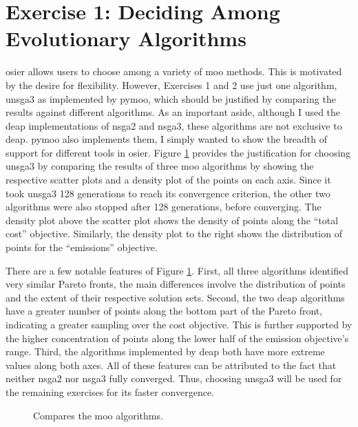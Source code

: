\section{Exercise 1: Deciding Among Evolutionary Algorithms}

\ac{osier} allows users to choose among a variety of \ac{moo} methods. This is
motivated by the desire for flexibility. However, Exercises 1 and 2 use just one
algorithm, \ac{unsga3} as implemented by \ac{pymoo}, which should be justified
by comparing the results against different algorithms. As an important aside,
although I used the \ac{deap} implementations of \ac{nsga2} and \ac{nsga3},
these algorithms are not exclusive to \ac{deap}. \ac{pymoo} also implements
them, I simply wanted to show the breadth of support for different tools in
\ac{osier}. Figure \ref{fig:algorithm-comparison} provides the justification for
choosing \ac{unsga3} by comparing the results of three \ac{moo} algorithms by
showing the respective scatter plots and a density plot of the points on each
axis. Since it took \ac{unsga3} 128 generations to reach its convergence
criterion, the other two algorithms were also stopped after 128 generations,
before converging. The density plot above the scatter plot shows the density of
points along the ``total cost'' objective. Similarly, the density plot to the
right shows the distribution of points for the ``emissions'' objective.

There are a few notable features of Figure \ref{fig:algorithm-comparison}.
First, all three algorithms identified very similar Pareto fronts, the main
differences involve the distribution of points and the extent of their
respective solution sets. Second, the two \ac{deap} algorithms have a greater
number of points along the bottom part of the Pareto front, indicating a greater
sampling over the cost objective. This is further supported by the higher
concentration of points along the lower half of the emission objective's range.
Third, the algorithms implemented by \ac{deap} both have more extreme values
along both axes. All of these features can be attributed to the fact that
neither \ac{nsga2} nor \ac{nsga3} fully converged. Thus, choosing \ac{unsga3}
will be used for the remaining exercises for its faster convergence.

\begin{figure}[ht]
  \centering
  \resizebox{0.75\columnwidth}{!}{}
  \caption{Compares the \ac{moo} algorithms.}
  \label{fig:algorithm-comparison}
\end{figure}



